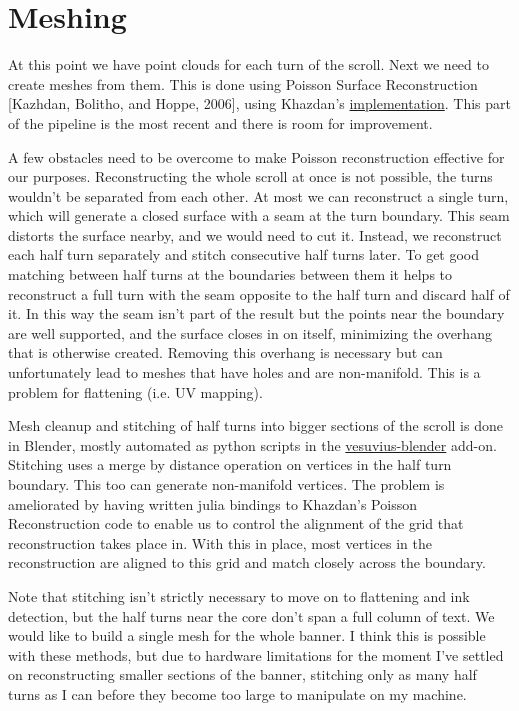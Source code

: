 \documentclass{article}
\begin{document}
\section{Meshing}

At this point we have point clouds for each turn of the scroll. Next we need to create meshes from them. This is done using Poisson Surface Reconstruction [Kazhdan, Bolitho, and Hoppe, 2006], using Khazdan's \href{https://github.com/mkazhdan/PoissonRecon}{implementation}. This part of the pipeline is the most recent and there is room for improvement.

A few obstacles need to be overcome to make Poisson reconstruction effective for our purposes. Reconstructing the whole scroll at once is not possible, the turns wouldn't be separated from each other. At most we can reconstruct a single turn, which will generate a closed surface with a seam at the turn boundary. This seam distorts the surface nearby, and we would need to cut it. Instead, we reconstruct each half turn separately and stitch consecutive half turns later. To get good matching between half turns at the boundaries between them it helps to reconstruct a full turn with the seam opposite to the half turn and discard half of it. In this way the seam isn't part of the result but the points near the boundary are well supported, and the surface closes in on itself, minimizing the overhang that is otherwise created. Removing this overhang is necessary but can unfortunately lead to meshes that have holes and are non-manifold. This is a problem for flattening (i.e. UV mapping).

Mesh cleanup and stitching of half turns into bigger sections of the scroll is done in Blender, mostly automated as python scripts in the \href{https://github.com/spelufo/vesuvius-blender}{vesuvius-blender} add-on. Stitching uses a merge by distance operation on vertices in the half turn boundary. This too can generate non-manifold vertices. The problem is ameliorated by having written julia bindings to Khazdan's Poisson Reconstruction code to enable us to control the alignment of the grid that reconstruction takes place in. With this in place, most vertices in the reconstruction are aligned to this grid and match closely across the boundary.

Note that stitching isn't strictly necessary to move on to flattening and ink detection, but the half turns near the core don't span a full column of text. We would like to build a single mesh for the whole banner. I think this is possible with these methods, but due to hardware limitations for the moment I've settled on reconstructing smaller sections of the banner, stitching only as many half turns as I can before they become too large to manipulate on my machine.
\end{document}
